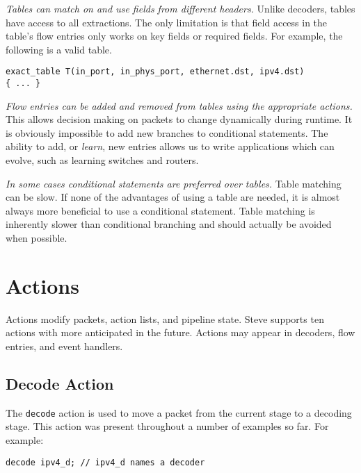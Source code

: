 \textit{Tables can match on and use fields from different headers.} Unlike
decoders, tables have access to all extractions. The only limitation is that
field access in the table's flow entries only works on key fields or required fields. For example, the
following is a valid table.

\begin{codepage}
\begin{lstlisting}
exact_table T(in_port, in_phys_port, ethernet.dst, ipv4.dst)
{ ... }
\end{lstlisting}
\end{codepage}

\textit{Flow entries can be added and removed from tables using the appropriate
actions.} This allows decision making on packets to change dynamically during
runtime. It is obviously impossible to add new branches to conditional
statements. The ability to add, or \textit{learn}, new entries allows us to
write applications which can evolve, such as learning switches and routers.

\textit{In some cases conditional statements are preferred over tables.} 
Table matching can be slow. If none of the advantages of using a table are 
needed, it is almost always more beneficial to use a conditional statement. Table 
matching is inherently slower than conditional branching and should actually be 
avoided when possible.

\section{Actions} \label{tut:action}

Actions modify packets, action lists, and pipeline state. Steve supports ten
actions with more anticipated in the future. Actions may appear in decoders,
flow entries, and event handlers.

\subsection{Decode Action} \label{tut:decode_action}

The \texttt{decode} action is used to move a packet from the current stage to a
decoding stage. This action was present throughout a number of examples so far.
For example:

\begin{codepage}
\begin{lstlisting}
decode ipv4_d; // ipv4_d names a decoder
\end{lstlisting}
\end{codepage}


